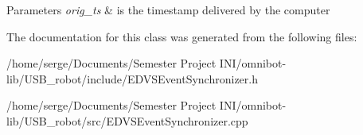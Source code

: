 \begin{DoxyParams}{Parameters}
{\em orig\+\_\+ts} & is the timestamp delivered by the computer \\
\hline
\end{DoxyParams}


The documentation for this class was generated from the following files\+:\begin{DoxyCompactItemize}
\item 
/home/serge/\+Documents/\+Semester Project I\+N\+I/omnibot-\/lib/\+U\+S\+B\+\_\+robot/include/E\+D\+V\+S\+Event\+Synchronizer.\+h\item 
/home/serge/\+Documents/\+Semester Project I\+N\+I/omnibot-\/lib/\+U\+S\+B\+\_\+robot/src/E\+D\+V\+S\+Event\+Synchronizer.\+cpp\end{DoxyCompactItemize}
